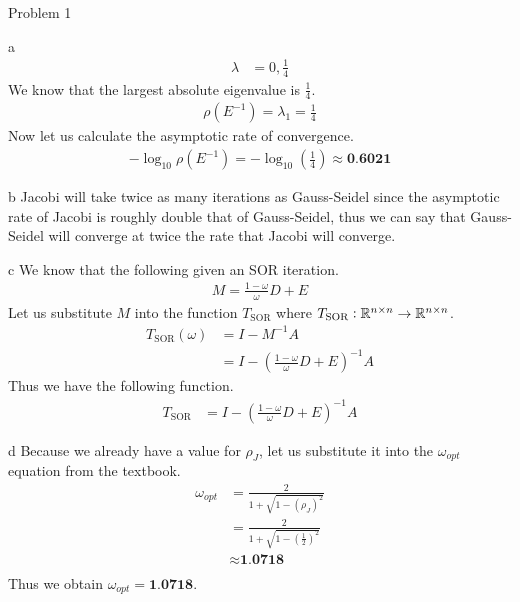 \begin{section}{Problem 1}
\begin{solution}{a}
\begin{align*}
            \lambda &= 0, \frac{1}{4}
        \end{align*}
        We know that the largest absolute eigenvalue is $\frac{1}{4}$.
        \begin{align*}
            \rho \left( E^{-1} \right) = \lambda_1 = \frac{1}{4}
        \end{align*}
        Now let us calculate the asymptotic rate of convergence.
        \begin{align*}
            - \log_{10} \rho \left( E^{-1} \right) = - \log_{10} \left( \frac{1}{4} \right) \approx \textbf{0.6021}
        \end{align*}
    \end{solution}

    \newpage

    \begin{solution}{b}
        Jacobi will take twice as many iterations as Gauss-Seidel since the asymptotic rate of Jacobi is roughly double that of Gauss-Seidel, thus we can say that Gauss-Seidel will converge at twice the rate that Jacobi will converge. 
    \end{solution}

    \newpage

    \begin{solution}{c}
        We know that the following given an SOR iteration.
        \begin{align*}
            M = \frac{1 - \omega}{\omega} D + E
        \end{align*}
        Let us substitute $M$ into the function $T_\text{SOR}$ where $T_\text{SOR} : \mathbb{R}^{n \times n} \rightarrow \mathbb{R}^{n \times n}$.
        \begin{align*}
            T_\text{SOR} (\omega) &= I - M^{-1} A \\
            &= I - \left( \frac{1 - \omega}{\omega} D + E \right)^{-1} A
        \end{align*}
        Thus we have the following function.
        \begin{align*}
            T_\text{SOR} &= I - \left( \frac{1 - \omega}{\omega} D + E \right)^{-1} A
        \end{align*}
    \end{solution}

    \newpage

    \begin{solution}{d}
        Because we already have a value for $\rho_J$, let us substitute it into the $\omega_{opt}$ equation from the textbook.
        \begin{align*}
            \omega_{opt} &= \frac{2}{1 + \sqrt{1 - \left( \rho_J \right)^2}} \\
            &= \frac{2}{1 + \sqrt{1 - \left( \frac{1}{2} \right)^2}} \\
            &\approx \textbf{1.0718} \\
        \end{align*}
        Thus we obtain $\omega_{opt} = \textbf{1.0718}$.
    \end{solution}


\end{section}
